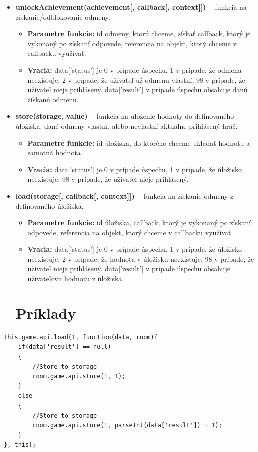 \begin{itemize}
\item \textbf{unlockAchievement(achievement[, callback[, context]]) –} funkcia na získanie/odblokovanie odmeny.
\begin{itemize}
\item \textbf{Parametre funkcie:} id odmeny, ktorú chceme, získať callback, ktorý je vykonaný po získaní odpovede, referencia na objekt, ktorý chceme v callbacku využívať. 
\item \textbf{Vracia:} data['status'] je 0 v prípade úspechu, 1 v prípade, že odmena neexistuje, 2 v prípade, že užívateľ už odmenu vlastní, 98 v prípade, že užívateľ nieje prihlásený. data['result'] v prípade úspechu obsahuje danú získanú odmenu.
\end{itemize}

\item \textbf{store(storage, value) –} funkcia na uloženie hodnoty do definovaného úložiska.
dané odmeny vlastní, alebo nevlastní aktuálne prihlásený hráč.
\begin{itemize}
\item \textbf{Parametre funkcie:} id úložiska, do ktorého chceme ukladať hodnotu a samotná hodnota 
\item \textbf{Vracia:} data['status'] je 0 v prípade úspechu, 1 v prípade, že úložisko neexistuje, 98 v prípade, že užívateľ nieje prihlásený.
\end{itemize}

\item \textbf{load(storage[, callback[, context]]) –} funkcia na získanie odmeny z definovaného úložiska.
\begin{itemize}
\item \textbf{Parametre funkcie:} id úložiska, callback, ktorý je vykonaný po získaní odpovede, referencia na objekt, ktorý chceme v callbacku využívať. 
\item \textbf{Vracia:} data['status'] je 0 v prípade úspechu, 1 v prípade, že úložisko neexistuje, 2 v prípade, že hodnota v úložisku neexistuje, 98 v prípade, že užívateľ nieje prihlásený. data['result'] v prípade úspechu obsahuje užívateľovu hodnotu z úložiska.
\end{itemize}

\section{Príklady}
\end{itemize}
\begin{lstlisting}[]
this.game.api.load(1, function(data, room){
    if(data['result'] == null)
    {
        //Store to storage
        room.game.api.store(1, 1);
    }
    else
    {
        //Store to storage
        room.game.api.store(1, parseInt(data['result']) + 1);
    }
}, this);
\end{lstlisting}

